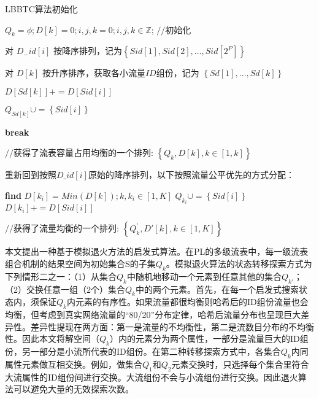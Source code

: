 \begin{algorithm}[!h]
	\caption{LBBTC算法初始化  \label{lbbtcinit}}
	\IncMargin{2em}
	\DontPrintSemicolon
	
	$Q_k = \phi; D[k]=0;i,j,k=0;i,j,k \in \mathbb{Z}$; $//$初始化
	
	对 $D_{-}id[i]$ 按降序排列，记为$\left\{ Sid\left[ 1\right] ,Sid\left[ 2\right] ,\ldots ,Sid\left[ 2^{P}\right] \right\} $\;
	
	{
		{
			对 $D[k]$ 按升序排序，获取各小流量$ID$组份，记为 $\left\{ Sd\left[ 1\right] ,\ldots ,Sd\left[ k\right] \right\} $\;
			
			{
				{
					$D\left[ Sd\left[ k\right] \right] +=D\left[ Sid\left[ i\right] \right] $\;
					
					$Q_{Sd\left[ k\right]} \cup =\left\{ Sid\left[ i\right] \right\} $\;
					
					\textbf{break}\;
				}
			}
		}
	}

$//$获得了流表容量占用均衡的一个排列: $\left\{ Q_{k},D\left[ k\right] ,k\in \left[ 1,k\right] \right\} $\;


重新回到按照$D\_id[i]$原始的降序排列，以下按照流量公平优先的方式分配：

{
	\textbf{find} $D\left[ k_{i}\right] =Min\left( D\left[ k\right] \right) ;k,k_{i}\in \left[ 1,K\right] $\;
	$Q_{k_i}\cup =\left\{ Sid\left[ i\right] \right\} $\;
	$ D\left[ k_{i}\right] +=D\left[ Sid\left[ i\right] \right] $\;
}

$//$获得了流量均衡的一个排列: $\left\{ Q^{'}_{k},D'\left[ k\right] ,k\in \left[ 1,K\right] \right\} $\;



\end{algorithm}

本文提出一种基于模拟退火方法的启发式算法。在PL的多级流表中，每一级流表组合机制的结果空间为初始集合S的子集$Q_k$。模拟退火算法的状态转移探索方式为下列情形二之一：（1）从集合$Q_k$中随机地移动一个元素到任意其他的集合$Q_{k'}$；（2）交换任意一组（2个）集合$Q_k$中的两个元素。首先，在每一个启发式搜索状态内，须保证$Q_k$内元素的有序性。如果流量都很均衡则哈希后的ID组份流量也会均衡，但考虑到真实网络流量的“80/20”分布定律，哈希后流量分布也呈现巨大差异性。差异性提现在两方面：第一是流量的不均衡性，第二是流数目分布的不均衡性。因此本文将解空间（$Q_k$）内的元素分为两个属性，一部分是流量巨大的ID组份，另一部分是小流所代表的ID组份。在第二种转移探索方式中，各集合$Q_k$内同属性元素做互相交换。例如，做集合$Q_1$和$Q_2$元素交换时，只选择每个集合里符合大流属性的ID组份间进行交换。大流组份不会与小流组份进行交换。因此退火算法可以避免大量的无效探索次数。


